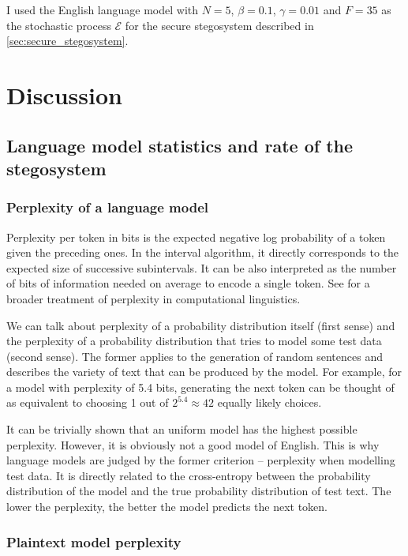 \documentclass[draft]{IIBproject}
\makeatletter
\DeclareRobustCommand*{\AbbreviationWithDot}[1]{\@ifnextchar{.}{#1}{#1.\@\xspace}}
\DeclareRobustCommand*{\iid}{\AbbreviationWithDot{i.i.d}}
\makeatother
\begin{document}
I used the English language model with $N = 5$, $\beta = 0.1$, $\gamma = 0.01$ and $F = 35$ as the stochastic process $\mathcal E$ for the secure stegosystem described in \cref{sec:secure_stegosystem}.

\clearpage
\section{Discussion}

\subsection{Language model statistics and rate of the stegosystem}

\subsubsection{Perplexity of a language model}

Perplexity per token in bits is the expected negative log probability of a token given the preceding ones. In the interval algorithm, it directly corresponds to the expected size of successive subintervals. It can be also interpreted as the number of bits of information needed on average to encode a single token. See \cite{brown1992entropy} for a broader treatment of perplexity in computational linguistics.

We can talk about perplexity of a probability distribution itself (first sense) and the perplexity of a probability distribution that tries to model some test data (second sense). The former applies to the generation of random sentences and describes the variety of text that can be produced by the model. For example, for a model with perplexity of 5.4 bits, generating the next token can be thought of as equivalent to choosing 1 out of $2^{5.4} \approx 42$ equally likely choices.

It can be trivially shown that an \iid uniform model has the highest possible perplexity. However, it is obviously not a good model of English. This is why language models are judged by the former criterion -- perplexity when modelling test data. It is directly related to the cross-entropy between the probability distribution of the model and the true probability distribution of test text. The lower the perplexity, the better the model predicts the next token.

\subsubsection{Plaintext model perplexity}
\end{document}
